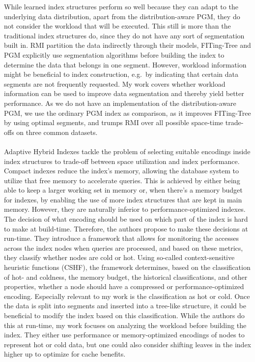 While learned index structures perform so well because they can adapt to the underlying data distribution, apart from the distribution-aware PGM, they do not consider the workload that will be executed. This still is more than the traditional index structures do, since they do not have any sort of segmentation built in. RMI partition the data indirectly through their models, FITing-Tree and PGM explicitly use segmentation algorithms before building the index to determine the data that belongs in one segment. However, workload information might be beneficial to index construction, e.g.~by indicating that certain data segments are not frequently requested. My work covers whether workload information can be used to improve data segmentation and thereby yield better performance. As we do not have an implementation of the distribution-aware PGM, we use the ordinary PGM index as comparison, as it improves FITing-Tree by using optimal segments, and trumps RMI over all possible space-time trade-offs on three common datasets.

\paragraph{}
Adaptive Hybrid Indexes \cite{Anneser2022} tackle the problem of selecting suitable encodings inside index structures to trade-off between space utilization and index performance. Compact indexes reduce the index's memory, allowing the database system to utilize that free memory to accelerate queries. This is achieved by either being able to keep a larger working set in memory or, when there's a memory budget for indexes, by enabling the use of more index structures that are kept in main memory. However, they are naturally inferior to performance-optimized indexes. The decision of what encoding should be used on which part of the index is hard to make at build-time. Therefore, the authors propose to make these decisions at run-time. They introduce a framework that allows for monitoring the accesses across the index nodes when queries are processed, and based on these metrics, they classify whether nodes are cold or hot. Using so-called context-sensitive heuristic functions (CSHF), the framework determines, based on the classification of hot- and coldness, the memory budget, the historical classifications, and other properties, whether a node should have a compressed or performance-optimized encoding. Especially relevant to my work is the classification as hot or cold. Once the data is split into segments and inserted into a tree-like structure, it could be beneficial to modify the index based on this classification. While the authors do this at run-time, my work focuses on analyzing the workload before building the index. They either use performance or memory-optimized encodings of nodes to represent hot or cold data, but one could also consider shifting leaves in the index higher up to optimize for cache benefits.

